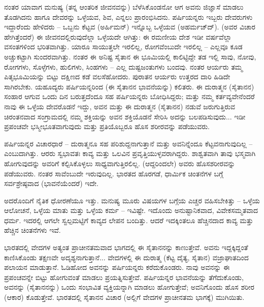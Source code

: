 \vskip 4pt

ನಂತರ ಯಾವಾಗ ಮನುಷ್ಯ (ತನ್ನ ಆಂತರಿಕ ಜೀವನವನ್ನು) ಬೆಳೆಸಿಕೊಂಡನೋ ಆಗ ಅವನು ಜಿಜ್ಞಾಸೆ ಮಾಡಲು ತೊಡಗಿದನು ಹಾಗೂ ದೇವರನ್ನು ಒಳ್ಳೆಯವ, ಶಿವ, ಎನ್ನಲು ಪ್ರಾರಂಭಿಸಿದನು. ಪರ್ಷಿಯನ್ನರು ಇಬ್ಬರು ದೇವರುಗಳು ಇದ್ದಾರೆಂದು ಹೇಳಿದರು – ಒಬ್ಬನು ಕೆಟ್ಟವ (ಅರ್ಹಿಮನ್‌) ಇನ್ನೊಬ್ಬ ಒಳ್ಳೆಯವ (ಅಹರ್ಮಜ್‌ದ್). (ಅವರ ವಿಚಾರ ಹೇಗಿತ್ತೆಂದರೆ) ಈ ಜೀವನದಲ್ಲಿರುವುದೆಲ್ಲಾ ಒಳ್ಳೆಯದೇ ಆಗಿತ್ತು: ಈ ರಮಣೀಯ ದೇಶ ಇಡೀ ವರ್ಷವೆಲ್ಲಾ ವಸಂತಗಳಿಂದ ಭರಿತವಾಗಿತ್ತು. ಯಾರೂ ಸಾಯುತ್ತಲೇ ಇರಲಿಲ್ಲ, ರೋಗವೆಂಬುದೇ ಇರಲಿಲ್ಲ – ಎಲ್ಲವೂ ಕೂಡ ಅಚ್ಚುಕಟ್ಟಾಗಿ ಸುಂದರವಾಗಿತ್ತು. ನಂತರ ಈ ಅನಿಷ್ಟ ಸೈತಾನ ಈ ಭೂಮಿಯಲ್ಲಿ ಕಾಲಿಟ್ಟಿದ್ದೇ ತಡ ಇಲ್ಲಿ ಸಾವು, ನೋವು, ರೋಗಗಳು, ಸೊಳ್ಳೆಗಳು, ಹುಲಿಗಳು, ಸಿಂಹಗಳು – ಎಲ್ಲ ದುಷ್ಟಜಂತುಗಳು ಬಂದವು. ನಂತರ ಆರ್ಯರು ತಮ್ಮ ಪಿತೃಭೂಮಿಯನ್ನು ಬಿಟ್ಟು ದಕ್ಷಿಣದ ಕಡೆ ವಲಸೆಹೋದರು. ಪುರಾತನ ಆರ್ಯರು ಉತ್ತರದ ದಾರಿ ಹಿಡಿದೇ ಸಾಗಿರಬೇಕು. ಯಹೂದ್ಯರು ಪರ್ಷಿಯನ್ನರಿಂದ (ಈ ಸೈತಾನನ ಭಾವನೆಯನ್ನು) ಕಲಿತರು. ಈ ದುರಾತ್ಮನ (ಸೈತಾನನ) ಸಂಹಾರ ಆಗುವ ಒಂದು ದಿನ ಬರುತ್ತದೆಂದೂ ಸಹ ಪರ್ಷಿಯನ್ನರು ಬೋಧಿಸಿದ್ದರು; ಮತ್ತು ನಮ್ಮ ಕರ್ತವ್ಯವೇನೆಂದರೆ ನಾವು ಈ ಒಳ್ಳೆಯ ದೇವರೊಡನೆ ಇದ್ದು, ಅವನ ಮತ್ತು ಈ ದುರಾತ್ಮನ (ಸೈತಾನನ) ನಡುವೆ ಜರುಗುತ್ತಿರುವ ಚಿರಂತನವಾದ ಸಂಗ್ರಾಮದಲ್ಲಿ ನಮ್ಮ ಶಕ್ತಿಯನ್ನು ಅವನ ಶಕ್ತಿಯೊಡನೆ ಸೇರಿಸಿ ಅದನ್ನು ಬಲಪಡಿಸುವುದು... ಇಡೀ ಪ್ರಪಂಚವೇ ಭಸ್ಮೀಭೂತವಾಗುವುದು ಮತ್ತು ಪ್ರತಿಯೊಬ್ಬರೂ ಹೊಸ ಶರೀರವನ್ನು ಪಡೆಯುವರು.

\vskip 4pt

ಪರ್ಷಿಯನ್ನರ ವಿಚಾರಧಾರೆ – ದುರಾತ್ಮನೂ ಸಹ ಪರಿಶುದ್ದನಾಗುತ್ತಾನೆ ಮತ್ತು ಅವನಿನ್ನೆಂದೂ ಕೆಟ್ಟವನಾಗುವುದಿಲ್ಲ – ಎಂಬುದಾಗಿತ್ತು. ಆರರು ಸ್ವಭಾವತಃ ಕಾವ್ಯ ಮತ್ತು ಒಲವಿನ ಪ್ರವೃತ್ತಿಯುಳ್ಳವರಾಗಿದ್ದರು. ಶಾಶ್ವತವಾಗಿ ತಾವು ಭಸ್ಮವಾಗಿ ಹೋಗುವುದನ್ನು ಅವರಿಗೆ ಕಲ್ಪಿಸಿಕೊಳ್ಳಲು ಸಾಧ್ಯವಾಗುತ್ತಿರಲಿಲ್ಲ. (ಆದ್ದರಿಂದಲೇ) ಅವರು ಹೊಸ\break ಶರೀರವನ್ನು ಪಡೆಯುವರು. ನಂತರ ಸಾವೆಂಬುದೇ ಇರುವುದಿಲ್ಲ. ಭಾರತದ ಹೊರಗಡೆ, ಧಾರ್ಮಿಕ ಚಿಂತನೆಗಳ ಬಗ್ಗೆ ಸರ್ವಶ್ರೇಷ್ಠವಾದ (ಭಾವನೆಯೆಂದರೆ) ಇದೇ.

\vskip 4pt

ಅದರೊಂದಿಗೆ ನೈತಿಕ ಧೋರಣೆಯೂ ಇತ್ತು. ಮನುಷ್ಯ ಮೂರು ವಿಷಯಗಳ ಬಗ್ಗೆಯ ಎಚ್ಚರ ವಹಿಸಬೇಕಿತ್ತು – ಒಳ್ಳೆಯ ಆಲೋಚನೆ, ಒಳ್ಳೆಯ ಮಾತು ಮತ್ತು ಒಳ್ಳೆಯ ಕರ್ಮ – ಇವಿಷ್ಟೇ. ಇದೊಂದು ಅನುಷ್ಟಾನಿಕವಾದ, ವಿವೇಕಸಮ್ಮತವಾದ ಧರ್ಮ. ಇದರಲ್ಲಿ ಆಗಲೇ ಸ್ವಲ್ಪಮಟ್ಟಿಗೆ ಕಾವ್ಯದ ಲೇಪನ ಬಂದಿತ್ತು. ಆದರೆ ಇದಕ್ಕಿಂತಲೂ ಹೆಚ್ಚಿನದಾದ ಕಾವ್ಯ ಮತ್ತು ಹೆಚ್ಚಿನ ಚಿಂತನೆಗಳು ಇವೆ.

\vskip 4pt

ಭಾರತದಲ್ಲಿ ವೇದಗಳ ಅತ್ಯಂತ ಪ್ರಾಚೀನತಮವಾದ ಭಾಗದಲ್ಲಿ ಈ ಸೈತಾನನನ್ನು ಕಾಣುತ್ತೇವೆ. ಅವನು ಇದ್ದಕ್ಕಿದ್ದಂತೆ ಕಾಣಿಸಿಕೊಂಡು ತಕ್ಷಣವೇ ಅದೃಶ್ಯನಾಗುತ್ತಾನೆ... ವೇದಗಳಲ್ಲಿ ಈ ದುರಾತ್ಮ (ಕೆಟ್ಟ ದೈತ್ಯ, ಸೈತಾನ) ವಜ್ರಾಘಾತದಿಂದ ಪಲಾಯನ ಮಾಡುತ್ತಾನೆ. ಓಡಿಹೋದ ಅವನನ್ನು ಪರ್ಷಿಯನ್ನರು ಕರೆದುಕೊಂಡರು. ನಾವು ಅವನನ್ನು ಈ ಪ್ರಪಂಚವನ್ನೇ ಬಿಟ್ಟು ಹೋಗುವಂತೆ ಮಾಡಲು ಪ್ರಯತ್ನಿಸುತ್ತೇವೆ. ಪರ್ಷಿಯನ್ನರ ಭಾವನೆಯನ್ನು ತೆಗೆದುಕೊಂಡು, ಅವನನ್ನು (ಸೈತಾನನನ್ನು) ಒಂದು ಸಂಭಾವಿತ ವ್ಯಕ್ತಿಯನ್ನಾಗಿ ಮಾಡಲು ಹೋಗುತ್ತೇವೆ; ಅವನಿಗೊಂದು ಹೊಸ ಶರೀರ (ಆಕಾರ) ಕೊಡುತ್ತೇವೆ. ಭಾರತದಲ್ಲಿ ಸೈತಾನನ ವಿಚಾರ (ಅಲ್ಲಿಗೆ ವೇದಗಳ ಪ್ರಾಚೀನತಮ ಭಾಗಕ್ಕೆ) ಮುಗಿಯಿತು.

